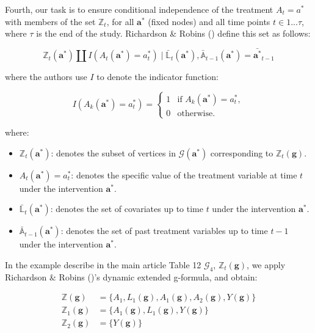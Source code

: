 \documentclass[
  single column]{article}
\providecommand{\tightlist}{%
  \setlength{\itemsep}{0pt}\setlength{\parskip}{0pt}}\usepackage{longtable,booktabs,array}
\begin{document}
Fourth, our task is to ensure conditional independence of the treatment
\(A_t = a^*\) with members of the set \(\mathbb{Z}_t\), for all
\(\mathbf{a}^*\) (fixed nodes) and all time points \(t \in 1...\tau\),
where \(\tau\) is the end of the study. Richardson \& Robins
() define this set as follows:

\[
\mathbb{Z}_t(\mathbf{a}^*) \coprod I(A_t(\mathbf{a}^*) = a^*_t) \mid \bar{\mathbb{L}}_t(\mathbf{a}^*), \bar{\mathbb{A}}_{t-1}(\mathbf{a}^*) = \bar{\mathbf{a}^*}_{t-1}
\]

where the authors use \(I\) to denote the indicator function:

\[
I(A_k(\mathbf{a}^*) = a^*_t) = 
\begin{cases} 
1 & \text{if } A_k(\mathbf{a}^*) = a^*_t, \\
0 & \text{otherwise}.
\end{cases}
\]

where:

\begin{itemize}
\tightlist
\item
  \textbf{\(\mathbb{Z}_t(\mathbf{a}^*)\)}: denotes the subset of
  vertices in \(\mathcal{G}(\mathbf{a}^*)\) corresponding to
  \(\mathbb{Z}_t(\mathbf{g})\).
\item
  \textbf{\(A_t(\mathbf{a}^*) = a^*_t\)}: denotes the specific value of
  the treatment variable at time \(t\) under the intervention
  \(\mathbf{a}^*\).
\item
  \textbf{\(\bar{\mathbb{L}}_t(\mathbf{a}^*)\)}: denotes the set of
  covariates up to time \(t\) under the intervention \(\mathbf{a}^*\).
\item
  \textbf{\(\bar{\mathbb{A}}_{t-1}(\mathbf{a}^*)\)}: denotes the set of
  past treatment variables up to time \(t-1\) under the intervention
  \(\mathbf{a}^*\).
\end{itemize}

In the example describe in the main article Table 12 \(\mathcal{G}_4\),
\(\mathbb{Z}_t(\mathbf{g})\), we apply Richardson \& Robins
()'s dynamic extended g-formula, and
obtain:

\[
\begin{aligned}
\mathbb{Z}(\mathbf{g}) &= \{A_1, L_1(\mathbf{g}), A_1(\mathbf{g}), A_2(\mathbf{g}), Y(\mathbf{g})\} \\
\mathbb{Z}_1(\mathbf{g}) &= \{A_1(\mathbf{g}), L_1(\mathbf{g}), Y(\mathbf{g})\} \\
\mathbb{Z}_2(\mathbf{g}) &= \{Y(\mathbf{g})\}
\end{aligned}
\]
\end{document}
